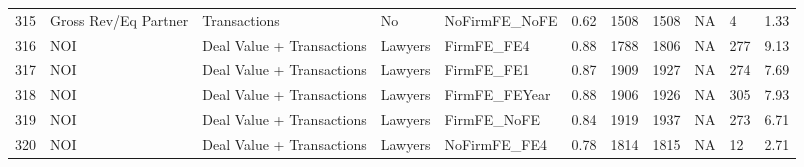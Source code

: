 \documentclass{article}
\begin{document}
\begin{table}[H]
\begin{tabular}{rllllllllll}
  315 & Gross Rev/Eq Partner & Transactions & No & NoFirmFE\_NoFE & 0.62 & 1508 & 1508 & NA & 4 & 1.33 \\
  316 & NOI & Deal Value + Transactions & Lawyers & FirmFE\_FE4 & 0.88 & 1788 & 1806 & NA & 277 & 9.13 \\
  317 & NOI & Deal Value + Transactions & Lawyers & FirmFE\_FE1 & 0.87 & 1909 & 1927 & NA & 274 & 7.69 \\
  318 & NOI & Deal Value + Transactions & Lawyers & FirmFE\_FEYear & 0.88 & 1906 & 1926 & NA & 305 & 7.93 \\
  319 & NOI & Deal Value + Transactions & Lawyers & FirmFE\_NoFE & 0.84 & 1919 & 1937 & NA & 273 & 6.71 \\
  320 & NOI & Deal Value + Transactions & Lawyers & NoFirmFE\_FE4 & 0.78 & 1814 & 1815 & NA & 12 & 2.71 \\
   \hline
\end{tabular}
\end{table}
\end{document}
